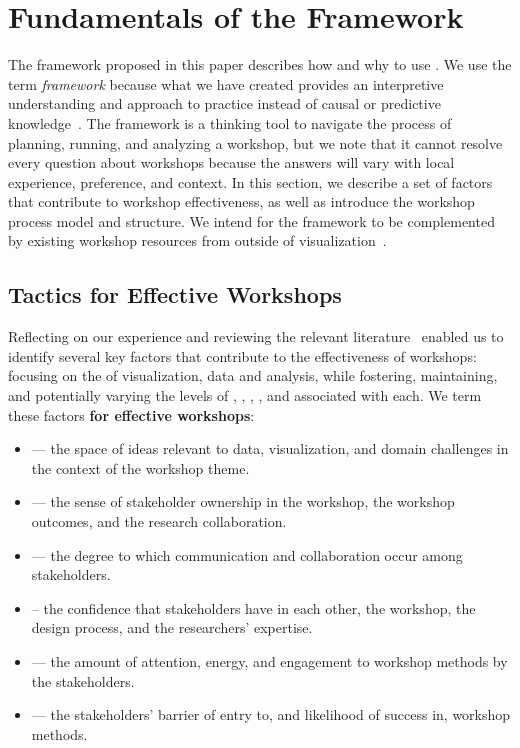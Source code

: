 \section{Fundamentals of the Framework}
\label{sec:framework}

The framework proposed in this paper describes how and why to use \workshops. We use the term {\it framework} because what we have created provides an interpretive understanding and approach to practice instead of causal or predictive knowledge~\cite{Jabareen2008}. 
The framework is a thinking tool to navigate the process of planning, running, and analyzing a workshop, but we note that it cannot resolve every question about workshops because the answers will vary with local experience, preference, and context. In this section, we describe a set of factors that contribute to workshop effectiveness, as well as introduce the workshop process model and structure. 
We intend for the framework to be complemented by existing workshop resources from outside of visualization~\cite{CreativeEducationFoundation2015,Brooks-Harris1999,Gray2010,Hamilton2016}.

\subsection{Tactics for Effective Workshops}

Reflecting on our experience and reviewing the relevant literature~\cite{Nickerson1999,Osborn1953,Sawyer2003,Sawyer2006,Shneiderman2005} enabled us to identify several key factors that contribute to the effectiveness of workshops: focusing on the \topic of visualization, data and analysis, while fostering, maintaining, and potentially varying the levels of \agency, \collegiality, \trust, \interest, and \challenge associated with each. We term these factors {\bf \tactics for effective workshops}:  
\begin{itemize}[noitemsep,nolistsep]
\item {} --- the space of ideas relevant to data, visualization, and domain challenges in the context of the workshop theme.
\item {} --- the sense of stakeholder ownership in the workshop, the workshop outcomes, and the research collaboration.
\item {} --- the degree to which communication and collaboration occur among stakeholders.
\item {} -- the confidence that stakeholders have in each other, the workshop, the design process, and the researchers' expertise.
\item {} --- the amount of attention, energy, and engagement to workshop methods by the stakeholders.
\item {} --- the stakeholders' barrier of entry to, and likelihood of success in, workshop methods.
\end{itemize}

